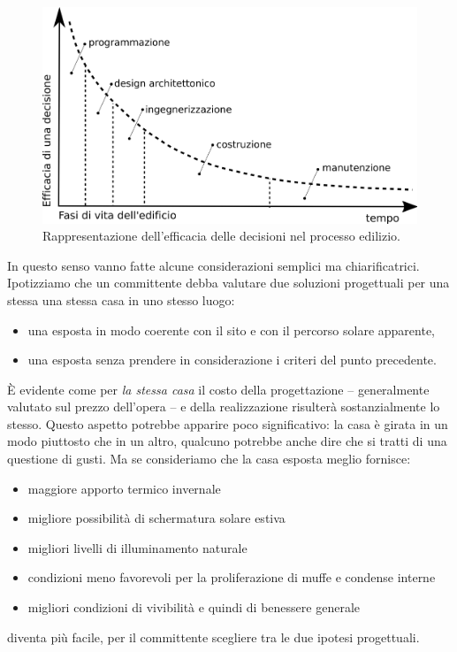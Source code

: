 \begin{figure}[htbp]
\centering  %
\includegraphics[width=1\textwidth,keepaspectratio]{images/lechner/efficacia-decisioni-fede}
\caption[SHORT]{Rappresentazione dell'efficacia delle decisioni nel processo edilizio.}
\label{fig:efficacia-decis-lechner}
\end{figure}


In questo senso vanno fatte alcune considerazioni semplici ma chiarificatrici. Ipotizziamo che un committente debba valutare due soluzioni progettuali per una stessa una stessa casa in uno stesso luogo:

\begin{itemize}
\item una esposta in modo coerente con il sito e con il percorso solare apparente,

\item una esposta senza prendere in considerazione i criteri del punto precedente.

\end{itemize}

È evidente come per \emph{la stessa casa} il costo della progettazione – generalmente valutato sul prezzo dell'opera – e della realizzazione risulterà sostanzialmente lo stesso. Questo aspetto potrebbe apparire poco significativo: la casa è girata in un modo piuttosto che in un altro, qualcuno potrebbe anche dire che si tratti di una questione di gusti. Ma se consideriamo che la casa esposta meglio fornisce:

\begin{itemize}
\item maggiore apporto termico invernale

\item migliore possibilità di schermatura solare estiva

\item migliori livelli di illuminamento naturale

\item condizioni meno favorevoli per la proliferazione di muffe e condense interne

\item migliori condizioni di vivibilità e quindi di benessere generale

\end{itemize}

diventa più facile, per il committente scegliere tra le due ipotesi progettuali.
